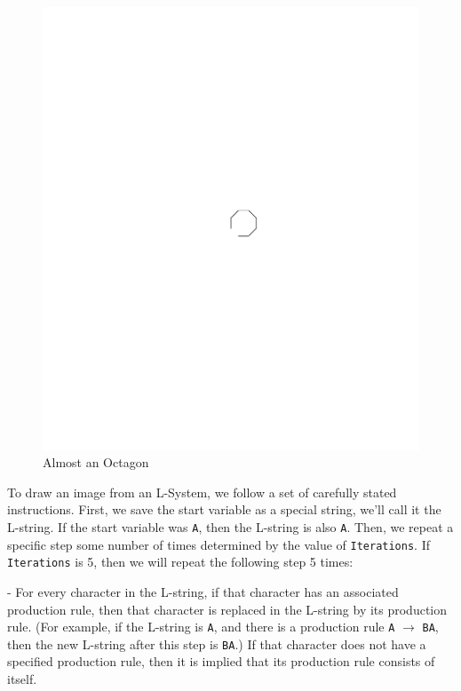 \documentclass[12pt,twoside]{reedthesis}
\newcommand{\code}[1]{\texttt{#1}}
\begin{document}
	\begin{figure}[h!]
	\centering
	\includegraphics[clip=true, viewport=4in 5.68in 7in 6.37in, scale=1]{Images/UnderstandingThroughDefinitions1}
	\caption[Almost an Octagon]{Almost an Octagon\footnotemark}
	\label {UnderstandingThroughDefinitions1}
	\end{figure}
	
	To draw an image from an L-System, we follow a set of carefully stated instructions. First, we save the start variable as a special string, we'll call it the L-string. If the start variable was \code{A}, then the L-string is also \code{A}. Then, we repeat a specific step some number of times determined by the value of \code{Iterations}. If \code{Iterations} is 5, then we will repeat the following step 5 times:\\
	
	\begin{addmargin}[4em]{4em}
	- For every character in the L-string, if that character has an associated production rule, then that character is replaced in the L-string by its production rule. (For example, if the L-string is \code{A}, and there is a production rule \code{A} $\rightarrow$ \code{BA}, then the new L-string after this step is \code{BA}.) If that character does not have a specified production rule, then it is implied that its production rule consists of itself.\\
	 \end{addmargin}
	 
\end{document}
